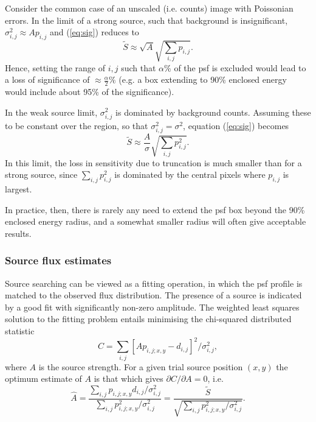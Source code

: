 Consider the common case of an unscaled (i.e. counts) image with Poissonian
errors. In the limit of a strong source, such that background is
insignificant, $\sigma^2_{i,j} \approx A p_{i,j}$ and (\ref{eq:sig}) reduces to
\begin{equation} 
\tilde{S} \approx \sqrt{A} \sqrt{\sum_{i,j} p_{i,j}} .
\end{equation}
Hence, setting the range of $i,j$ such that $\alpha\%$ of the psf is 
excluded would lead to a loss of significance of $\approx \frac{\alpha}{2}\%$
(e.g. a box extending to 90\% enclosed energy would include about 95\% of 
the significance).

In the weak source limit, $\sigma^2_{i,j}$ is dominated by background counts. 
Assuming these to be constant over the region, so that 
$\sigma^2_{i,j}=\sigma^2$, equation (\ref{eq:sig}) becomes
\begin{equation} 
\tilde{S} \approx \frac{A}{\sigma} \sqrt{\sum_{i,j} p_{i,j}^2} .
\end{equation}
In this limit, the loss in sensitivity due to truncation is much smaller than 
for a strong source, since 
${\displaystyle \sum_{i,j} p_{i,j}^2}$ is dominated by the central pixels where
$p_{i,j}$ is largest. 

In practice, then, there is rarely any need to extend the psf box beyond the 
90\% enclosed energy radius, and a somewhat smaller radius will often give 
acceptable results.

\subsubsection{Source flux estimates}

Source searching can be viewed as a fitting operation, in which the psf 
profile is matched to the observed flux distribution. The presence of a source 
is indicated by a good fit with significantly non-zero amplitude. The weighted 
least squares solution to the fitting problem entails minimising the 
chi-squared distributed statistic
\begin{equation}
\label{eq:C}
C=\sum_{i,j}[A p_{i,j;x,y} - d_{i,j}]^2/\sigma^2_{i,j},
\end{equation}
where $A$ is the source strength. For a given trial source position $(x,y)$ 
the optimum estimate of $A$ is that which gives $\partial C/\partial A = 0$, 
i.e.
\begin{equation}
\label{eq:flux}
\hat{A}=\frac{\displaystyle \sum_{i,j} p_{i,j;x,y} d_{i,j} / \sigma^2_{i,j}}
{\displaystyle \sum_{i,j} p_{i,j;x,y}^2 /\sigma^2_{i,j}} = \frac{\tilde{S}}
{\sqrt{\displaystyle \sum_{i,j} p_{i,j;x,y}^2 /\sigma^2_{i,j}}}.
\end{equation}

